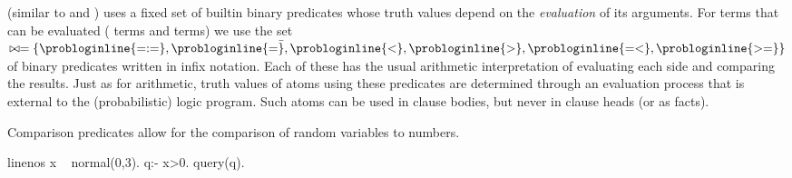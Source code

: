 \begin{definition} \label{def:comparison}
	\dcproblogsty (similar to \prologsty and \problogsty) uses a fixed set of builtin binary predicates whose truth values depend on the \emph{evaluation} of its arguments. For terms that can be evaluated ( terms and  terms) we use the set
	$\bowtie=\{ \text{\probloginline{=:=}}, \text{\probloginline{=\=}}, \text{\probloginline{<}}, \text{\probloginline{>}},  \text{\probloginline{=<}}, \text{\probloginline{>=}} \}$
	of binary predicates written in infix notation.
	Each of these has the usual \prologsty arithmetic interpretation of evaluating each side and comparing the results.
	Just as for \prologsty arithmetic, truth values of atoms using these predicates are determined through an evaluation process that is external to the (probabilistic) logic program. Such atoms can be used in clause bodies, but never in clause heads (or as facts).
\end{definition}


\begin{example} Comparison predicates allow for the comparison of random variables to numbers. 
	\begin{problog*}{linenos}
x ~ normal(0,3).
q:- x>0.
query(q).
	\end{problog*}
\end{example}




